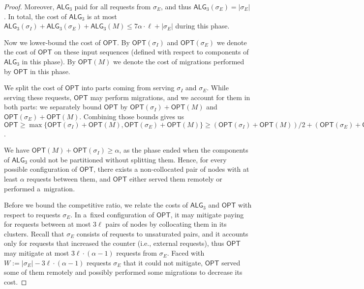 \documentclass[manuscript,screen=true, review, anonymous]{acmart}
\newcommand{\OPT}{\textsf{OPT}\xspace}
\newcommand{\TAlg}{{\ensuremath{\textsf{ALG}_{3}}}\xspace} %
\newcommand\maciek[1]{\color{brown}\textbf{\\ Maciek: #1}\color{black}}
\begin{document}
\begin{proof}

  Moreover, \TAlg paid for all requests from $\sigma_E$, and thus $\TAlg(\sigma_E) = |\sigma_E|$.
  In total, the cost of \TAlg is at most $\TAlg(\sigma_I) + \TAlg(\sigma_E) + \TAlg(M) \leq 7\alpha\cdot \ell + |\sigma_E|$ during this phase.

  \medskip

  Now we lower-bound the cost of $\OPT$.
  By $\OPT(\sigma_I)$ and $\OPT(\sigma_E)$ we denote the cost of $\OPT$ on these input sequences (defined with respect to components of \TAlg in this phase).
  By $\OPT(M)$ we denote the cost of migrations performed by $\OPT$ in this phase.
  
  We split the cost of $\OPT$ into parts coming from serving $\sigma_I$ and $\sigma_E$.
  While serving these requests, $\OPT$ may perform migrations, and we account for them in both parts: we separately bound $\OPT$ by $\OPT(\sigma_I) + \OPT(M)$ and $\OPT(\sigma_E) + \OPT(M)$.
  Combining those bounds gives us $\OPT \geq \max\{\OPT(\sigma_I) + \OPT(M), \OPT(\sigma_E) + \OPT(M)\} \geq (\OPT(\sigma_I) + \OPT(M)) / 2 + (\OPT(\sigma_E) + \OPT(M)) / 2$.


  We have $\OPT(M) + \OPT(\sigma_I) \geq \alpha$, as the phase ended when the components of \TAlg{} could not be partitioned without splitting them.
  Hence, for every possible configuration of $\OPT$, there exists a non-collocated pair of nodes with at least $\alpha$ requests between them, and
  $\OPT$ either served them remotely or performed a~migration.

  \medskip
  Before we bound the competitive ratio, we relate the costs of $\TAlg$ and $\OPT$ with respect to requests $\sigma_E$.
  In a~fixed configuration of $\OPT$, it may mitigate paying for requests between at most $3\ell$ pairs of nodes by collocating them in its clusters.
  Recall that $\sigma_E$ consists of requests to unsaturated pairs, and it accounts only for requests that increased the counter (i.e., external requests), thus $\OPT$ may mitigate at most $3\ell\cdot(\alpha - 1)$ requests from $\sigma_E$.
  Faced with $W := |\sigma_E| - 3\ell\cdot(\alpha-1)$ requests $\sigma_E$ that it could not mitigate, $\OPT$ served some of them remotely and possibly performed some migrations to decrease its cost.



\end{proof}
\end{document}
